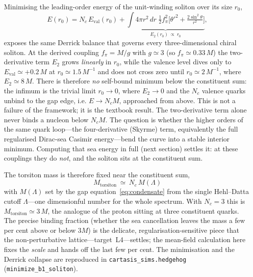 Minimising the leading-order energy of the unit-winding soliton over its size $r_0$,
\begin{equation}
  E(r_0) = N_c\,E_\mathrm{val}(r_0) + \underbrace{\int 4\pi r^2\,dr\;\tfrac12 f_\pi^2
  \Big[\theta'^2 + \tfrac{2\sin^2\theta}{r^2}\Big]}_{E_2(r_0)\ \propto\ r_0},
  \label{eq:hhE}
\end{equation}
exposes the same Derrick balance that governs every three-dimensional chiral soliton. At the derived
coupling $f_\pi=M/g$ with $g\simeq3$ (so $f_\pi\simeq0.33\,M$) the two-derivative term $E_2$ grows
\emph{linearly} in $r_0$, while the valence level dives only to $E_\mathrm{val}\simeq+0.2\,M$ at
$r_0\simeq1.5\,M^{-1}$ and does not cross zero until $r_0\simeq2\,M^{-1}$, where $E_2\simeq8\,M$.
There is therefore \emph{no} self-bound minimum below the constituent sum: the infimum is the trivial
limit $r_0\!\to\!0$, where $E_2\!\to\!0$ and the $N_c$ valence quarks unbind to the gap edge, i.e.
$E\to N_cM$, approached from above. This is not a failure of the framework; it is the textbook
result. The two-derivative term alone never binds a nucleon below $N_cM$. The question is whether the
higher orders of the same quark loop---the four-derivative (Skyrme) term, equivalently the full
regularised Dirac-sea Casimir energy---bend the curve into a stable interior minimum. Computing that
sea energy in full (next section) settles it: at these couplings they do \emph{not}, and the soliton
sits at the constituent sum.

The torsiton mass is therefore fixed near the constituent sum,
\begin{equation}
  \boxed{\ M_\mathrm{torsiton}\ \simeq\ N_c\,M(\Lambda)\ }
  \label{eq:torsitonmass}
\end{equation}
with $M(\Lambda)$ set by the gap equation~\eqref{eq:condensate} from the single Hehl--Datta cutoff
$\Lambda$---one dimensionful number for the whole spectrum. With $N_c=3$ this is $M_\mathrm{torsiton}
\simeq3\,M$, the analogue of the proton sitting at three constituent quarks. The precise binding
fraction (whether the sea cancellation leaves the mass a few per cent above or below $3M$) is the
delicate, regularisation-sensitive piece that the non-perturbative lattice---target~L4---settles; the
mean-field calculation here fixes the \emph{scale} and hands off the last few per cent. The
minimisation and the Derrick collapse are reproduced in \texttt{cartasis\_sims.hedgehog}
(\texttt{minimize\_b1\_soliton}).


